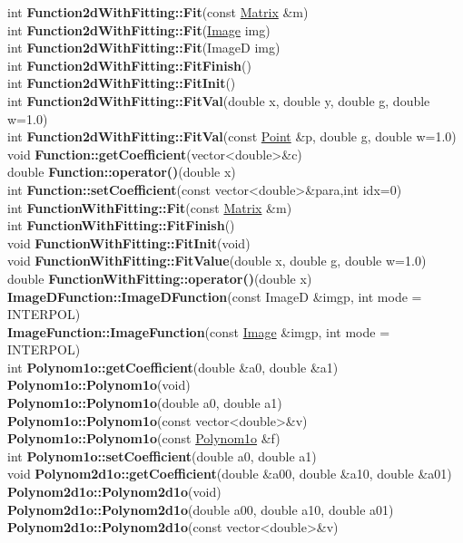 \documentclass[10pt,titlepage]{article}
\def\functionlistentry#1#2#3#4#5#6{\noindent #1 {\bf #2}(#3) \dotfill #6\\}
\begin{document}
{{\functionlistentry{int}{Function2dWithFitting::Fit}{const \hyperlink{Matrix}{Matrix} \&m}{1027}{functions}{}
\functionlistentry{int}{Function2dWithFitting::Fit}{\hyperlink{Image}{Image} img}{1028}{functions}{}
\functionlistentry{int}{Function2dWithFitting::Fit}{ImageD img}{1029}{functions}{}
\functionlistentry{int}{Function2dWithFitting::FitFinish}{}{1026}{functions}{}
\functionlistentry{int}{Function2dWithFitting::FitInit}{}{1023}{functions}{}
\functionlistentry{int}{Function2dWithFitting::FitVal}{double x, double y, double g, double w=1.0}{1024}{functions}{}
\functionlistentry{int}{Function2dWithFitting::FitVal}{const \hyperlink{Point}{Point} \&p, double g, double w=1.0}{1025}{functions}{}
\functionlistentry{void}{Function::getCoefficient}{vector\textless {}double\textgreater  \&c}{990}{functions}{}
\functionlistentry{double}{Function::operator()}{double x}{989}{functions}{}
\functionlistentry{int}{Function::setCoefficient}{const vector\textless {}double\textgreater  \&para,int idx=0}{991}{functions}{}
\functionlistentry{int}{FunctionWithFitting::Fit}{const \hyperlink{Matrix}{Matrix} \&m}{995}{functions}{}
\functionlistentry{int}{FunctionWithFitting::FitFinish}{}{994}{functions}{}
\functionlistentry{void}{FunctionWithFitting::FitInit}{void}{992}{functions}{}
\functionlistentry{void}{FunctionWithFitting::FitValue}{double x, double g, double w=1.0}{993}{functions}{}
\functionlistentry{double}{FunctionWithFitting::operator()}{double x}{996}{functions}{}
\functionlistentry{}{ImageDFunction::ImageDFunction}{const ImageD \&imgp, int mode = INTERPOL}{1062}{functions}{}
\functionlistentry{}{ImageFunction::ImageFunction}{const \hyperlink{Image}{Image} \&imgp, int mode = INTERPOL}{1061}{functions}{}
\functionlistentry{int}{Polynom1o::getCoefficient}{double \&a0, double \&a1}{1008}{functions}{}
\functionlistentry{}{Polynom1o::Polynom1o}{void}{1003}{functions}{}
\functionlistentry{}{Polynom1o::Polynom1o}{double a0, double a1}{1004}{functions}{}
\functionlistentry{}{Polynom1o::Polynom1o}{const vector\textless {}double\textgreater  \&v}{1005}{functions}{}
\functionlistentry{}{Polynom1o::Polynom1o}{const \hyperlink{Polynom1o}{Polynom1o} \&f}{1006}{functions}{}
\functionlistentry{int}{Polynom1o::setCoefficient}{double a0, double a1}{1007}{functions}{}
\functionlistentry{void}{Polynom2d1o::getCoefficient}{double \&a00, double \&a10, double \&a01}{1043}{functions}{}
\functionlistentry{}{Polynom2d1o::Polynom2d1o}{void}{1038}{functions}{}
\functionlistentry{}{Polynom2d1o::Polynom2d1o}{double a00, double a10, double a01}{1039}{functions}{}
\functionlistentry{}{Polynom2d1o::Polynom2d1o}{const vector\textless {}double\textgreater  \&v}{1040}{functions}{}
}}
\end{document}

